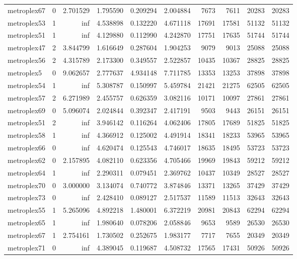 \begin{longtable}{|l|r|r|r|r|r|r|r|r|r|}
metroplex67 & 0 & 2.701529 & 1.795590 & 0.209294 & 2.004884 & 7673 & 7611 & 20283 & 20283 \\
metroplex53 & 1 & inf & 4.538898 & 0.132220 & 4.671118 & 17691 & 17581 & 51132 & 51132 \\
metroplex51 & 1 & inf & 4.129880 & 0.112990 & 4.242870 & 17751 & 17635 & 51744 & 51744 \\
metroplex47 & 2 & 3.844799 & 1.616649 & 0.287604 & 1.904253 & 9079 & 9013 & 25088 & 25088 \\
metroplex56 & 2 & 4.315789 & 2.173300 & 0.349557 & 2.522857 & 10435 & 10367 & 28825 & 28825 \\
metroplex5 & 0 & 9.062657 & 2.777637 & 4.934148 & 7.711785 & 13353 & 13253 & 37898 & 37898 \\
metroplex54 & 1 & inf & 5.308787 & 0.150997 & 5.459784 & 21421 & 21275 & 62505 & 62505 \\
metroplex57 & 2 & 6.271989 & 2.455757 & 0.626359 & 3.082116 & 10171 & 10097 & 27861 & 27861 \\
metroplex69 & 0 & 5.096074 & 2.024844 & 0.392347 & 2.417191 & 9503 & 9443 & 26151 & 26151 \\
metroplex51 & 2 & inf & 3.946142 & 0.116264 & 4.062406 & 17805 & 17689 & 51825 & 51825 \\
metroplex58 & 1 & inf & 4.366912 & 0.125002 & 4.491914 & 18341 & 18233 & 53965 & 53965 \\
metroplex66 & 0 & inf & 4.620474 & 0.125543 & 4.746017 & 18635 & 18495 & 53723 & 53723 \\
metroplex62 & 0 & 2.157895 & 4.082110 & 0.623356 & 4.705466 & 19969 & 19843 & 59212 & 59212 \\
metroplex64 & 1 & inf & 2.290311 & 0.079451 & 2.369762 & 10437 & 10349 & 28527 & 28527 \\
metroplex70 & 0 & 3.000000 & 3.134074 & 0.740772 & 3.874846 & 13371 & 13265 & 37429 & 37429 \\
metroplex73 & 0 & inf & 2.428410 & 0.089127 & 2.517537 & 11589 & 11513 & 32643 & 32643 \\
metroplex55 & 1 & 5.265096 & 4.892218 & 1.480001 & 6.372219 & 20981 & 20843 & 62294 & 62294 \\
metroplex65 & 1 & inf & 1.980640 & 0.078206 & 2.058846 & 9653 & 9589 & 26530 & 26530 \\
metroplex67 & 1 & 2.754161 & 1.730502 & 0.252675 & 1.983177 & 7717 & 7655 & 20349 & 20349 \\
metroplex71 & 0 & inf & 4.389045 & 0.119687 & 4.508732 & 17565 & 17431 & 50926 & 50926 \\

\end{longtable}
